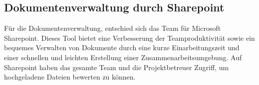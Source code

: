 \subsection{Dokumentenverwaltung durch Sharepoint}
Für die Dokumentenverwaltung, entschied sich das Team für Microsoft Sharepoint. Dieses Tool bietet eine Verbesserung der Teamproduktivität sowie ein bequemes Verwalten von Dokumente durch eine kurze Einarbeitungszeit und einer schnellen und leichten Erstellung einer Zusammenarbeitsumgebung. Auf Sharepoint haben das gesamte Team und die Projektbetreuer Zugriff, um hochgeladene Dateien bewerten zu können.

